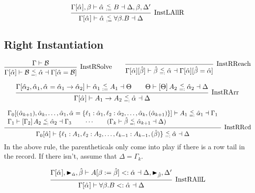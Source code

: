 \documentclass{article}
\newcommand{\B}{\mathcal{B}}
\newcommand{\marker}[1]{\RHD_{#1}}
\newcommand{\subtype}{<:}
\newcommand{\instLSymbol}{\;\substack{<\\:=}\;}
\newcommand{\instRSymbol}{\;\substack{<\\=:}\;}
\newcommand{\ev}{\hat}
\newcommand{\spc}{\qquad}
\newcommand{\apply}[1]{\left[#1\right]}
\newcommand{\eva}[1][]{\ev \alpha_{#1}}
\newcommand{\evb}{\ev \beta}
\newcommand{\subtypes}[4]{#1 \vdash #2 \subtype #3 \dashv #4}
\newcommand{\instL}[4]{#1 \vdash #2 \instLSymbol #3 \dashv #4}
\newcommand{\instR}[4]{#1 \vdash #2 \instRSymbol #3 \dashv #4}
\newcommand{\deduct}[3][]
{
  \begin{prooftree}
    \hypo{#2}
    \infer1[\text{#1}]{#3}
  \end{prooftree}
}
\begin{document}
\[
  \deduct[InstLAllR]
  { \instL{\Gamma[\eva], \beta}{\eva}{B}{\Delta, \beta, \Delta'} }
  { \instL{\Gamma[\eva]}{\eva}{\forall \beta. B}{\Delta} }
\]

\subsection{Right Instantiation}

\[
  \deduct[InstRSolve]
  {\Gamma \vdash \B}
  {\instR{\Gamma[\ev\alpha]}{\B}{\ev \alpha}{\Gamma[\ev\alpha = \B]}}
  \spc
  \deduct[InstRReach]
  {}
  {\instR{\Gamma[\ev\alpha][\ev\beta]}{\ev
      \beta}{\eva}{\Gamma[\ev\alpha][\ev\beta = \ev\alpha]}}
\]

\[
  \deduct[InstRArr] {\instL{\Gamma[\eva[2], \eva[1], \eva = \eva[1] \to
      \eva[2]]}{\eva[1]}{A_1}{\Theta} \spc \instR{\Theta}{\apply \Theta
      A_2}{\eva[2]}{\Delta} } {\instR{\Gamma[\eva]}{A_1 \to A_2}{\eva}{\Delta}}
\]

\[
  \deduct[InstRRcd]
  {
    \begin{array}{l}
     \instR{\Gamma_0[(\eva[k+1]), \eva[k], \dots, \eva[1], \eva=\{\ell_1 : \eva[1],
      \ell_2 : \eva[2], \dots, \eva[k], (\eva[k+1])\}]}{A_1}{\eva[1]}{\Gamma_1} \\
    \instR{\Gamma_1}{\apply{\Gamma_2} A_2}{\eva[2]}{\Gamma_3} \spc \cdots \spc
     (\instR{\Gamma_k}{\evb}{\eva[k+1]}{\Delta})
  \end{array}
  }
  {\instR{\Gamma_0[\eva]}{\{\ell_1:A_1, \ell_2 : A_2, \dots, \ell_{k-1} : A_{k-1}, (\evb)\}}{\eva}{\Delta}}
\]
In the above rule, the parentheticals only come into play if there is a row tail
in the record. If there isn't, assume that \(\Delta = \Gamma_k\).

\[
  \deduct[InstRAllL]
  { \subtypes{\Gamma[\eva], \marker{\ev\alpha}, \evb}{A[\beta := \evb]}{\eva}{\Delta, \marker{\evb}, \Delta'} }
  { \subtypes{\Gamma[\eva]}{\forall \beta. B}{\eva}{\Delta} }
\]
\end{document}
